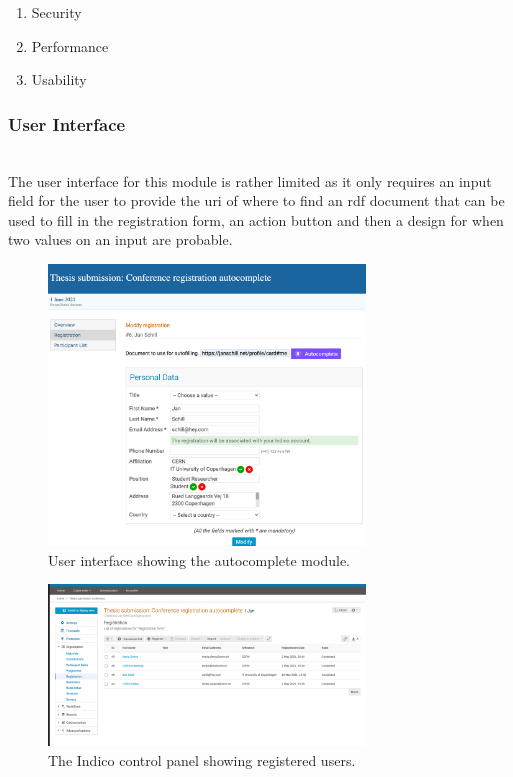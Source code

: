 \begin{enumerate}
    \item Security
    \item Performance
    \item Usability
\end{enumerate}

\subsubsection{User Interface}\mbox{}\\

The user interface for this module is rather limited as it only requires an input field for the user to provide the \gls{uri} of where to find an \gls{rdf} document that can be used to fill in the registration form, an action button and then a design for when two values on an input are probable.

\begin{figure}[H]
    \centering
    \includegraphics[width=0.75\textwidth]{prototype/poc-solid-autocomplete-conference-registration.png}
    \caption{User interface showing the autocomplete module.}
    \label{fig:poc-solid-autocomplete-conference-registration}
\end{figure}

\begin{figure}[H]
    \centering
    \includegraphics[width=0.75\textwidth]{prototype/poc-solid-autocomplete-conference-registration-attendees.png}
    \caption{The Indico control panel showing registered users.}
    \label{fig:poc-solid-autocomplete-conference-registration-attendees}
\end{figure}

